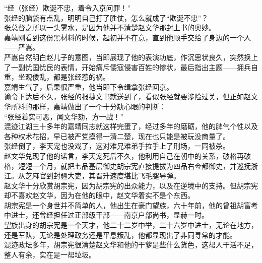 \begin{multicols}{\theparacolNo}
“经（张经）欺诞不忠，着令入京问罪！”\\

张经的脑袋有点乱，明明自己打了胜仗，怎么就成了“欺诞不忠”？\\

张总督之所以一头雾水，是因为他并不清楚赵文华那封上书的奥妙。\\

嘉靖刚看到这份黑材料的时候，起初并不在意，直到他顺手交给了身边的一个人——严嵩。\\

严嵩自然明白赵儿子的意图，当即展现了他的表演功底，作沉思状良久，突然换上了一副忧国忧民的表情，开始痛斥倭寇侵害百姓的惨状，最后指出主题——拥兵自重，坐观倭乱，都是张经惹的祸。\\

嘉靖生气了，后果很严重，他当即下令缉拿张经回京。\\

谕令下达后不久，张经的报捷文书就送到了，看似张经就要涉险过关，但正如赵文华所料的那样，嘉靖做出了一个十分缺心眼的判断：\\

“张经着实可恶，闻文华劾，方一战！”\\

混迹江湖三十多年的嘉靖同志就这样完蛋了，经过多年的磨砺，他的脾气个性以及各种权术花招，早已被严党摸得一清二楚，现在也只能是被玩没商量了。\\

张经倒了，李天宠也没戏了，这对难兄难弟手拉手上了刑场，一同被杀。\\

赵文华兑现了他的诺言，李天宠死后不久，他利用自己在朝中的关系，破格再破格，短短一个月，就把七品基层御史胡宗宪直接提拔为四品右佥都御史，并巡抚浙江。从芝麻官到封疆大吏，其晋升速度堪比飞毛腿导弹。\\

赵文华十分欣赏胡宗宪，因为胡宗宪的出众能力，以及在逆境中的支持。但胡宗宪却不喜欢赵文华，因为在他的眼中，赵文华着实不是个东西。\\

胡宗宪是一个身世并不简单的人，他出生在豪门望族，六十年前，他的曾祖胡富考中进士，还曾经担任过正部级干部——南京户部尚书，显赫一时。\\

望族出身的胡宗宪是一个天才，他二十二岁中举，二十六岁中进士，无论在地方，还是军队，无论是处理政务还是平息叛乱，他都显现出了非同寻常的才能。\\

混迹政坛多年，胡宗宪很清楚赵文华和他的干爹是些什么货色，这帮人干活不足，整人有余，实在是一帮垃圾。\\


\end{multicols}
